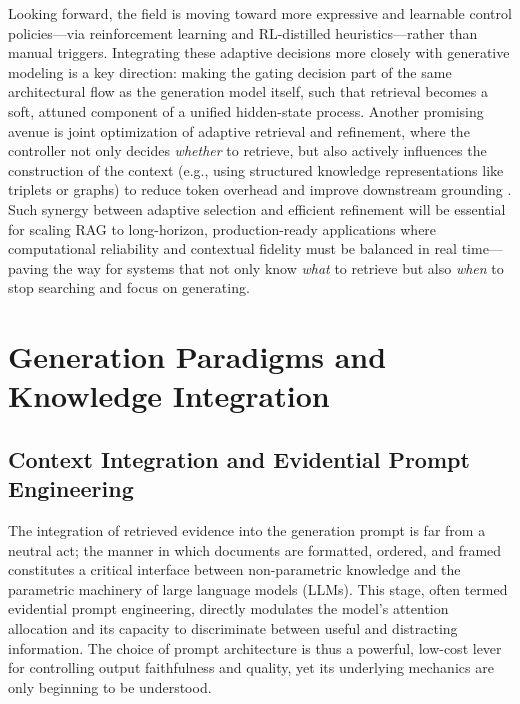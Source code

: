 \documentclass[11pt,a4paper]{article}
\begin{document}
Looking forward, the field is moving toward more expressive and learnable control policies---via reinforcement learning and RL-distilled heuristics---rather than manual triggers. Integrating these adaptive decisions more closely with generative modeling is a key direction: making the gating decision part of the same architectural flow as the generation model itself, such that retrieval becomes a soft, attuned component of a unified hidden-state process. Another promising avenue is joint optimization of adaptive retrieval and refinement, where the controller not only decides \emph{whether} to retrieve, but also actively influences the construction of the context (e.g., using structured knowledge representations like triplets or graphs) to reduce token overhead and improve downstream grounding \cite{arxiv:2511.05385v2}. Such synergy between adaptive selection and efficient refinement will be essential for scaling RAG to long-horizon, production-ready applications where computational reliability and contextual fidelity must be balanced in real time---paving the way for systems that not only know \emph{what} to retrieve but also \emph{when} to stop searching and focus on generating.


\section{Generation Paradigms and Knowledge Integration}



\subsection{Context Integration and Evidential Prompt Engineering}


The integration of retrieved evidence into the generation prompt is far from a neutral act; the manner in which documents are formatted, ordered, and framed constitutes a critical interface between non-parametric knowledge and the parametric machinery of large language models (LLMs). This stage, often termed evidential prompt engineering, directly modulates the model's attention allocation and its capacity to discriminate between useful and distracting information. The choice of prompt architecture is thus a powerful, low-cost lever for controlling output faithfulness and quality, yet its underlying mechanics are only beginning to be understood.
\end{document}
